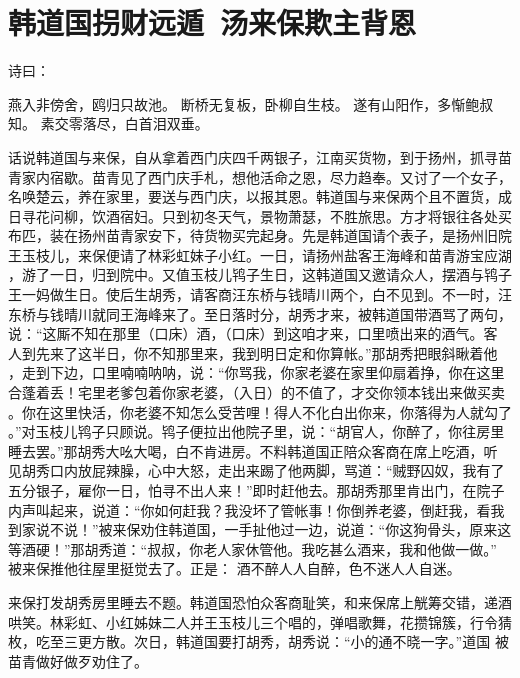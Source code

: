 \chapter{韩道国拐财远遁~汤来保欺主背恩}

诗曰：

燕入非傍舍，鸥归只故池。
断桥无复板，卧柳自生枝。
遂有山阳作，多惭鲍叔知。
素交零落尽，白首泪双垂。

话说韩道国与来保，自从拿着西门庆四千两银子，江南买货物，到于扬州，抓寻苗
青家内宿歇。苗青见了西门庆手札，想他活命之恩，尽力趋奉。又讨了一个女子，
名唤楚云，养在家里，要送与西门庆，以报其恩。韩道国与来保两个且不置货，成
日寻花问柳，饮酒宿妇。只到初冬天气，景物萧瑟，不胜旅思。方才将银往各处买
布匹，装在扬州苗青家安下，待货物买完起身。先是韩道国请个表子，是扬州旧院
王玉枝儿，来保便请了林彩虹妹子小红。一日，请扬州盐客王海峰和苗青游宝应湖
，游了一日，归到院中。又值玉枝儿鸨子生日，这韩道国又邀请众人，摆酒与鸨子
王一妈做生日。使后生胡秀，请客商汪东桥与钱晴川两个，白不见到。不一时，汪
东桥与钱晴川就同王海峰来了。至日落时分，胡秀才来，被韩道国带酒骂了两句，
说：“这厮不知在那里（口床）酒，（口床）到这咱才来，口里喷出来的酒气。客
人到先来了这半日，你不知那里来，我到明日定和你算帐。”那胡秀把眼斜瞅着他
，走到下边，口里喃喃呐呐，说：“你骂我，你家老婆在家里仰扇着挣，你在这里
合蓬着丢！宅里老爹包着你家老婆，（入日）的不值了，才交你领本钱出来做买卖
。你在这里快活，你老婆不知怎么受苦哩！得人不化白出你来，你落得为人就勾了
。”对玉枝儿鸨子只顾说。鸨子便拉出他院子里，说：“胡官人，你醉了，你往房里
睡去罢。”那胡秀大吆大喝，白不肯进房。不料韩道国正陪众客商在席上吃酒，听
见胡秀口内放屁辣臊，心中大怒，走出来踢了他两脚，骂道：“贼野囚奴，我有了
五分银子，雇你一日，怕寻不出人来！”即时赶他去。那胡秀那里肯出门，在院子
内声叫起来，说道：“你如何赶我？我没坏了管帐事！你倒养老婆，倒赶我，看我
到家说不说！”被来保劝住韩道国，一手扯他过一边，说道：“你这狗骨头，原来这
等酒硬！”那胡秀道：“叔叔，你老人家休管他。我吃甚么酒来，我和他做一做。”
被来保推他往屋里挺觉去了。正是：
酒不醉人人自醉，色不迷人人自迷。

来保打发胡秀房里睡去不题。韩道国恐怕众客商耻笑，和来保席上觥筹交错，递酒
哄笑。林彩虹、小红姊妹二人并王玉枝儿三个唱的，弹唱歌舞，花攒锦簇，行令猜
枚，吃至三更方散。次日，韩道国要打胡秀，胡秀说：“小的通不晓一字。”道国
被苗青做好做歹劝住了。

